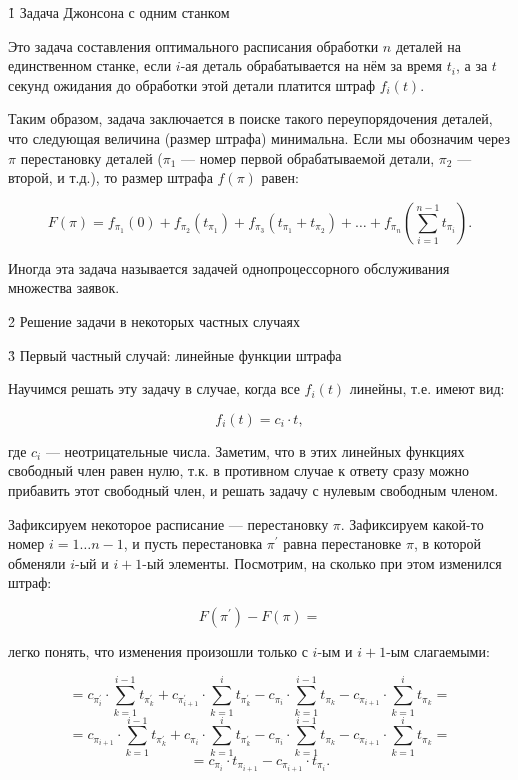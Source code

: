\h1{ Задача Джонсона с одним станком }

Это задача составления оптимального расписания обработки $n$ деталей на единственном станке, если $i$-ая деталь обрабатывается на нём за время $t_i$, а за $t$ секунд ожидания до обработки этой детали платится штраф $f_i(t)$.

Таким образом, задача заключается в поиске такого переупорядочения деталей, что следующая величина (размер штрафа) минимальна. Если мы обозначим через $\pi$ перестановку деталей ($\pi_1$ --- номер первой обрабатываемой детали, $\pi_2$ --- второй, и т.д.), то размер штрафа $f(\pi)$ равен:

$$ F(\pi) = f_{\pi_1}(0) + f_{\pi_2}(t_{\pi_1}) + f_{\pi_3}(t_{\pi_1} + t_{\pi_2}) + \ldots + f_{\pi_n}\left(\sum_{i=1}^{n-1} t_{\pi_i}\right). $$

Иногда эта задача называется задачей однопроцессорного обслуживания множества заявок.


\h2{ Решение задачи в некоторых частных случаях }


\h3{ Первый частный случай: линейные функции штрафа }

Научимся решать эту задачу в случае, когда все $f_i(t)$ линейны, т.е. имеют вид:

$$ f_i(t) = c_i \cdot t, $$

где $c_i$ --- неотрицательные числа. Заметим, что в этих линейных функциях свободный член равен нулю, т.к. в противном случае к ответу сразу можно прибавить этот свободный член, и решать задачу с нулевым свободным членом.

Зафиксируем некоторое расписание --- перестановку $\pi$. Зафиксируем какой-то номер $i=1 \ldots n-1$, и пусть перестановка $\pi^\prime$ равна перестановке $\pi$, в которой обменяли $i$-ый и $i+1$-ый элементы. Посмотрим, на сколько при этом изменился штраф:

$$ F(\pi^\prime) - F(\pi) = $$

легко понять, что изменения произошли только с $i$-ым и $i+1$-ым слагаемыми:

$$ = c_{\pi^\prime_i} \cdot \sum_{k=1}^{i-1} t_{\pi^\prime_k} + c_{\pi^\prime_{i+1}} \cdot \sum_{k=1}^{i} t_{\pi^\prime_k} - c_{\pi_i} \cdot \sum_{k=1}^{i-1} t_{\pi_k} - c_{\pi_{i+1}} \cdot \sum_{k=1}^{i} t_{\pi_k} = $$
$$ = c_{\pi_{i+1}} \cdot \sum_{k=1}^{i-1} t_{\pi^\prime_k} + c_{\pi_i} \cdot \sum_{k=1}^{i} t_{\pi_k^\prime} - c_{\pi_i} \cdot \sum_{k=1}^{i-1} t_{\pi_k} - c_{\pi_{i+1}} \cdot \sum_{k=1}^{i} t_{\pi_k} = $$
$$ = c_{\pi_i} \cdot t_{\pi_{i+1}} - c_{\pi_{i+1}} \cdot t_{\pi_i}. $$

